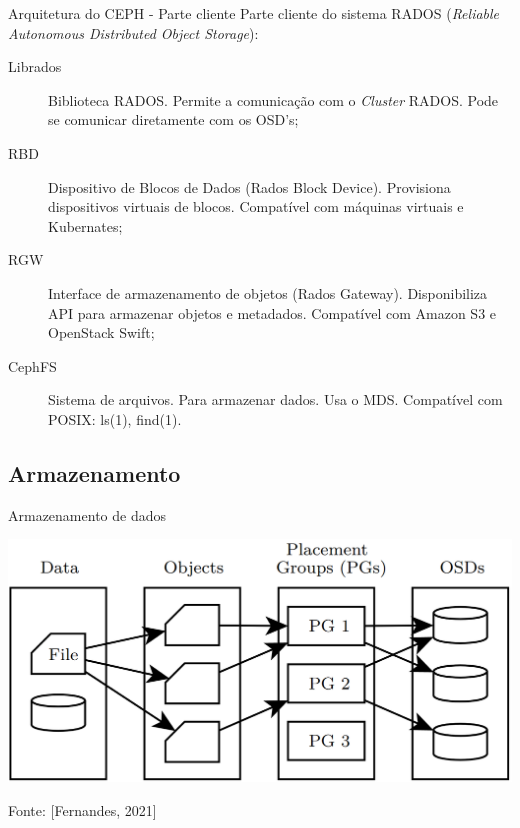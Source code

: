 \documentclass[xcolor=dvipsnames,table]{beamer}
\begin{document}
\begin{frame}{Arquitetura do CEPH - Parte cliente}
	Parte cliente do sistema RADOS (\textit{Reliable Autonomous Distributed Object Storage}):
	\begin{description}
		\item[Librados] Biblioteca RADOS. Permite a comunicação com o \textit{Cluster} RADOS. Pode se comunicar diretamente com os OSD's; \pause
		\item[RBD] Dispositivo de Blocos de Dados (Rados Block Device). Provisiona dispositivos virtuais de blocos. Compatível com máquinas virtuais e Kubernates; \pause
		\item[RGW] Interface de armazenamento de objetos (Rados Gateway). Disponibiliza API para armazenar objetos e metadados. Compatível com Amazon S3 e OpenStack Swift; \pause
		\item[CephFS] Sistema de arquivos. Para armazenar dados. Usa o MDS. Compatível com POSIX: ls(1), find(1).
	\end{description}
\end{frame}

\subsection{Armazenamento}
\begin{frame}{Armazenamento de dados}
	\begin{center}
		\includegraphics[scale=0.25]{ceph3.png}
	\end{center}
	Fonte: [Fernandes, 2021]
\end{frame}
\end{document}

